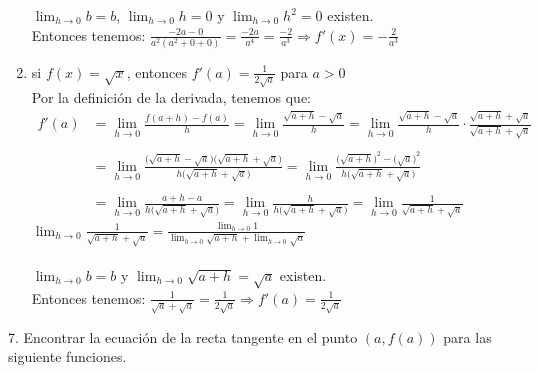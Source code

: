 \documentclass[12pt]{article}
\begin{document}
\begin{enumerate}[\hspace{9px} a)]
        \(\displaystyle\lim_{h \to 0}b=b\), \(\displaystyle\lim_{h \to 0}h=0\) y \(\displaystyle\lim_{h \to 0}h^2=0\) existen.\\

        Entonces tenemos: \quad \(\displaystyle\frac{-2a-0}{a^2(a^2+0+0)}=\frac{-2a}{a^4}=\frac{-2}{a^3} \Longrightarrow f'(x)=-\frac{2}{a^3}\)\\

    \item si \(f(x)=\sqrt{x}\), entonces \(f'(a)=\displaystyle\frac{1}{2\sqrt{a}}\) para \(a > 0\)\\

        Por la definición de la derivada, tenemos que:
        \begin{align*}
            f'(a)&=\displaystyle\lim_{h \to 0}\frac{f(a+h)-f(a)}{h}=\displaystyle\lim_{h \to 0}\frac{\sqrt{a+h}-\sqrt{a}}{h}=\displaystyle\lim_{h \to 0}\frac{\sqrt{a+h}-\sqrt{a}}{h} \cdot \frac{\sqrt{a+h}+\sqrt{a}}{\sqrt{a+h}+\sqrt{a}}\\ \\
            &=\displaystyle\lim_{h \to 0}\frac{\big(\sqrt{a+h}-\sqrt{a}\big)\big(\sqrt{a+h}+\sqrt{a}\big)}{h\big(\sqrt{a+h}+\sqrt{a}\big)}=\displaystyle\lim_{h \to 0}\frac{\big(\sqrt{a+h}\big)^2-(\sqrt{a}\big)^2}{h\big(\sqrt{a+h}+\sqrt{a}\big)}\\ \\
            &=\displaystyle\lim_{h \to 0}\frac{a+h-a}{h\big(\sqrt{a+h}+\sqrt{a}\big)}=\displaystyle\lim_{h \to 0}\frac{h}{h\big(\sqrt{a+h}+\sqrt{a}\big)}=\displaystyle\lim_{h \to 0}\frac{1}{\sqrt{a+h}+\sqrt{a}}
        \end{align*}
        \(\displaystyle\lim_{h \to 0}\frac{1}{\sqrt{a+h}+\sqrt{a}}=\displaystyle\frac{\displaystyle\lim_{h \to 0}1}{\displaystyle\lim_{h \to 0}\sqrt{a+h}+\displaystyle\lim_{h \to 0}\sqrt{a}}\)\\ \\

        \(\displaystyle\lim_{h \to 0}b=b\) y \(\displaystyle\lim_{h \to 0}\sqrt{a+h}=\sqrt{a}\)  existen.\\

        Entonces tenemos: \quad \(\displaystyle\frac{1}{\sqrt{a}+\sqrt{a}}=\frac{1}{2\sqrt{a}} \Longrightarrow f'(a)=\frac{1}{2\sqrt{a}}\)

\end{enumerate}

7. Encontrar la ecuación de la recta tangente en el punto \((a,f(a))\) para las siguiente funciones.
\end{document}
